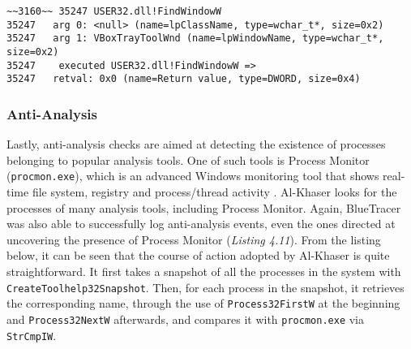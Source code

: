 \vspace{0.5cm}
\begin{lstlisting}[caption={ Log entry relative to \texttt{FindWindowW}},captionpos=b]
~~3160~~ 35247 USER32.dll!FindWindowW
35247 	arg 0: <null> (name=lpClassName, type=wchar_t*, size=0x2)
35247 	arg 1: VBoxTrayToolWnd (name=lpWindowName, type=wchar_t*, size=0x2)
35247    executed USER32.dll!FindWindowW =>
35247 	retval: 0x0 (name=Return value, type=DWORD, size=0x4)
\end{lstlisting}

\subsubsection{Anti-Analysis}

\iffalse
Check for processes of common anti-analysis tools
\fi

Lastly, anti-analysis checks are aimed at detecting the existence of processes belonging to popular analysis tools. One of such tools is Process Monitor (\texttt{procmon.exe}), which is an advanced Windows monitoring tool that shows real-time file system, registry and process/thread activity \cite{procmon}. Al-Khaser looks for the processes of many analysis tools, including Process Monitor. Again, BlueTracer was also able to successfully log anti-analysis events, even the ones directed at uncovering the presence of Process Monitor (\textit{Listing 4.11}). From the listing below, it can be seen that the course of action adopted by Al-Khaser is quite straightforward. It first takes a snapshot of all the processes in the system with \texttt{CreateToolhelp32Snapshot}. Then, for each process in the snapshot, it retrieves the corresponding name, through the use of \texttt{Process32FirstW} at the beginning and \texttt{Process32NextW} afterwards, and compares it with \texttt{procmon.exe} via \texttt{StrCmpIW}. 

